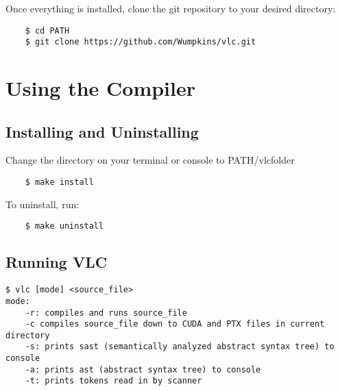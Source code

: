 \begin{homeworkProblem}
    Once everything is installed, clone the git repository to your desired directory:
	\begin{verbatim}
    $ cd PATH
    $ git clone https://github.com/Wumpkins/vlc.git
	\end{verbatim}


	\section{Using the Compiler}

    \subsection{Installing and Uninstalling}
    Change the directory on your terminal or console to PATH/vlc\textunderscore folder
    \begin{verbatim}
    $ make install
	\end{verbatim}
	
	To uninstall, run:
	\begin{verbatim}
    $ make uninstall
	\end{verbatim}

    \subsection{Running VLC}
	\begin{verbatim}
$ vlc [mode] <source_file>
mode:
    -r: compiles and runs source_file
    -c compiles source_file down to CUDA and PTX files in current directory
    -s: prints sast (semantically analyzed abstract syntax tree) to console
    -a: prints ast (abstract syntax tree) to console
    -t: prints tokens read in by scanner
	\end{verbatim}

\end{homeworkProblem}